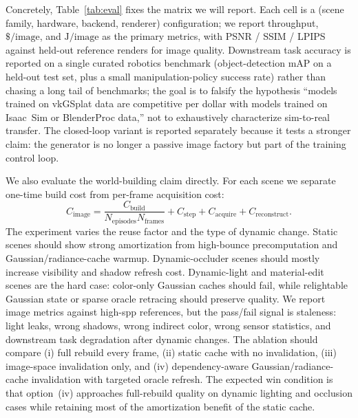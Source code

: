 \documentclass[10pt,journal,onecolumn]{IEEEtran}
\begin{document}
Concretely, Table~\ref{tab:eval} fixes the matrix we will report.
Each cell is a (scene family, hardware, backend, renderer)
configuration; we report throughput, $\$\slash\textrm{image}$, and
$\textrm{J}\slash\textrm{image}$ as the primary metrics, with PSNR /
SSIM / LPIPS against held-out reference renders for image quality.
Downstream task accuracy is reported on a single curated robotics benchmark
(object-detection mAP on a held-out test set, plus a small manipulation-policy
success rate) rather than chasing a long tail of benchmarks; the goal is to
falsify the hypothesis ``models trained on vkGSplat data are competitive per
dollar with models trained on Isaac~Sim or BlenderProc data,'' not to
exhaustively characterize sim-to-real transfer. The closed-loop variant is
reported separately because it tests a stronger claim: the generator is no
longer a passive image factory but part of the training control loop.

We also evaluate the world-building claim directly. For each scene we separate
one-time build cost from per-frame acquisition cost:
\[
  C_{\mathrm{image}} =
  \frac{C_{\mathrm{build}}}{N_{\mathrm{episodes}} N_{\mathrm{frames}}}
  + C_{\mathrm{step}} + C_{\mathrm{acquire}} + C_{\mathrm{reconstruct}}.
\]
The experiment varies the reuse factor and the type of dynamic change. Static
scenes should show strong amortization from high-bounce precomputation and
Gaussian/radiance-cache warmup. Dynamic-occluder scenes should mostly increase
visibility and shadow refresh cost. Dynamic-light and material-edit scenes are
the hard case: color-only Gaussian caches should fail, while relightable
Gaussian state or sparse oracle retracing should preserve quality. We report
image metrics against high-spp references, but the pass/fail signal is
staleness: light leaks, wrong shadows, wrong indirect color, wrong sensor
statistics, and downstream task degradation after dynamic changes.
The ablation should compare (i) full rebuild every frame, (ii) static cache with
no invalidation, (iii) image-space invalidation only, and (iv) dependency-aware
Gaussian/radiance-cache invalidation with targeted oracle refresh. The expected
win condition is that option~(iv) approaches full-rebuild quality on dynamic
lighting and occlusion cases while retaining most of the amortization benefit of
the static cache.
\end{document}
